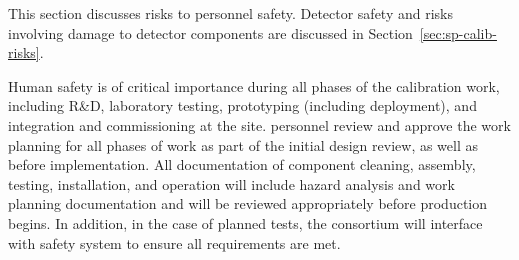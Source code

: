


This section discusses risks to personnel safety. Detector safety and risks involving damage to detector components are discussed in Section~\ref{sec:sp-calib-risks}.

Human safety is of critical importance during all phases of the calibration work, including R\&D, laboratory testing, prototyping (including  deployment), and integration and commissioning at the   site.   personnel review and approve the work planning for all phases of work as part of the initial design review, as well as before implementation. All documentation of component cleaning, assembly, testing, installation, and operation will include hazard analysis and work planning documentation and will be reviewed appropriately before production begins. In addition, in the case of planned  tests, the consortium will interface with  safety system to ensure all requirements are met.


